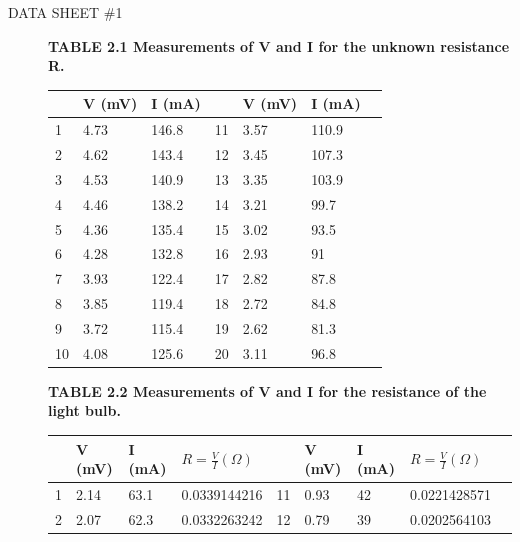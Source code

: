\documentclass{article}
\begin{document}
\begin{description}

\item[DATA SHEET \#1] \hfill
{}
\begin{samepage}
\textbf{ TABLE 2.1 Measurements of V and I for the unknown resistance R. } \
{\small{
\begin{center}
	\begin{tabular}{| l | l | l | l | l | l | l |}
	\hline
	&V (mV) & I (mA) & & V (mV) & I (mA) \\ \hline
	1	&4.73	&146.8	&11	&3.57	&110.9 \\ \hline
	2	&4.62	&143.4	&12	&3.45	&107.3 \\ \hline
	3	&4.53	&140.9	&13	&3.35	&103.9 \\ \hline
	4	&4.46	&138.2	&14	&3.21	&99.7 \\ \hline
	5	&4.36	&135.4	&15	&3.02	&93.5 \\ \hline
	6	&4.28	&132.8	&16	&2.93	&91 \\ \hline
	7	&3.93	&122.4	&17	&2.82	&87.8 \\ \hline
	8	&3.85	&119.4	&18	&2.72	&84.8 \\ \hline
	9	&3.72	&115.4	&19	&2.62	&81.3 \\ \hline
	10	&4.08	&125.6	&20	&3.11	&96.8 \\ \hline
	\end{tabular}
\end{center}
}}
\end{samepage}
\begin{samepage}
\textbf{ TABLE 2.2 Measurements of V and I for the resistance of the light bulb. } \
{\small{
\begin{center}
	\begin{tabular}{| l | l | l | l | l | l | l | l | l |}
	\hline
	&V (mV) & I (mA) & $R = \frac{V}{I}(\Omega)$ & & V (mV) & I (mA) & $R = \frac{V}{I}(\Omega)$  \\ \hline
	1	&2.14	&	63.1	&	0.0339144216	&11	&	0.93	&	42	&	0.0221428571 \\ \hline
	2	&2.07	&	62.3	&	0.0332263242	&12	&	0.79	&	39	&	0.0202564103 \\ \hline

\end{tabular}
\end{center}}}
\end{samepage}
\end{description}
\end{document}
